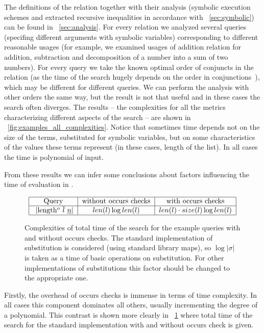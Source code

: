 The definitions of the relation together with their analysis (symbolic execution schemes and extracted recursive inequalities in accordance with \sectionword~\ref{sec:symbolic}) can be found in \appendixword~\ref{sec:analysis}. For every relation we analyzed several queries (specifing different arguments with symbolic variables) corresponding to different reasonable usages (for example, we examined usages of addition relation for addition, subtraction and decomposition of a number into a sum of two numbers). For every query we take the known optimal order of conjuncts in the relation (as the time of the search hugely depends on the order in conjunctions~\cite{WillThesis}), which may be different for different queries. We can perform the analysis with other orders the same way, but the result is not that useful and in these cases the search often diverges. The results -- the complexities for all the metrics characterizing different aspects of the search -- are shown in \figureword~\ref{fig:examples_all_complexities}. Notice that sometimes time depends not on the size of the terms, substituted for symbolic variables, but on some characteristics of the values these terms represent (in these cases, length of the list). In all cases the time is polynomial of input.

From these results we can infer some conclusions about factors influencing the time of evaluation in \mK.

\begin{figure}[t]
    \[
      \begin{tabular}{|c|c|c|}
           \hline
           Query & without occurs checks & with occurs checks  \\
           \hline
           \lstinline|length$^o$ $\overline{l}$ $\underline{n}$| & $len(l) \log len(l)$ & $len(l) \cdot size(l) \log len(l)$  \\
           \hline
            
      \end{tabular}
    \]
  \caption{Complexities of total time of the search for the example queries with and without occurs checks. The standard implementation of substitution is considered (using standard library maps), so $\log |\sigma|$ is taken as a time of basic operations on substitution. For other implementations of substitutions this factor should be changed to the appropriate one. }
  \label{fig:examples_total_times}
\end{figure}

Firstly, the overhead of occurs checks is immense in terms of time complexity. In all cases this component dominates all others, usually incrementing the degree of a polynomial. This contrast is shown more clearly in \figureword~\ref{fig:examples_total_times} where total time of the search for the standard implementation with and without occurs check is given. 

